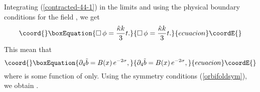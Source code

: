 \documentclass[a4paper,12pt]{article}
\begin{document}
Integrating (\ref{contracted-44-1}) in the limits \myHighlight{$(-\infty,\infty)$}\coordHE{} and
using the physical boundary conditions for the field \coordHE{}, we get
\begin{equation}\coord{}\boxEquation{\label{phi}
\Box\,\phi = \frac{\hat \kappa k}{3} t.
}{\Box\,\phi = \frac{\hat \kappa k}{3} t.
}{ecuacion}\coordE{}\end{equation}
This mean that
\begin{equation}\coord{}\boxEquation{
\partial_4 \tilde b =B(x) \, e^{-2\sigma},
}{
\partial_4 \tilde b =B(x) \, e^{-2\sigma},
}{ecuacion}\coordE{}\end{equation}
where \coordHE{} is some function of \coordHE{} only. Using the symmetry conditions
(\ref{orbifoldsym}), we obtain \coordHE{}.
\end{document}
